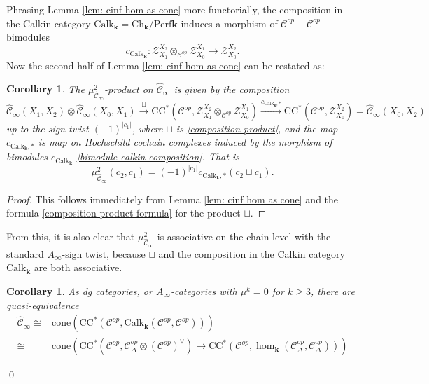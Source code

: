 \documentclass[11pt]{amsproc}
\def\K{{\mathbf{k}}}
\def\cZ{\mathcal{Z}}
\def\cc{\mathcal{C}}
\def\r#1{\mathrm{#1}}
\def\D{\Delta}
\def\ainf{A_\infty}
\def\ch{\mathrm{Ch}}
\def\perf{\mathrm{Perf}}
\def\calk{\mathrm{Calk}}
\def\cone{\mathrm{cone}}
\def\cinf{\widehat{\cc}_{\infty}}
\newtheorem{cor}[lem]{Corollary}
\theoremstyle{remark}
\numberwithin{equation}{section}
\begin{document}
Phrasing Lemma \ref{lem: cinf hom as cone} more functorially, 
the composition in the Calkin category $\calk_{\K} = \ch_{\K}/\perf \K$ induces a morphism of $\cc^{op}-\cc^{op}$-bimodules 
\begin{equation}\label{bimodule calkin composition}
c_{\calk_{\K}}: \cZ_{X_{1}}^{X_{2}} \otimes_{\cc^{op}} \cZ_{X_{0}}^{X_{1}} \to \cZ_{X_{0}}^{X_{2}}.
\end{equation}
Now the second half of Lemma \ref{lem: cinf hom as cone} can be restated as:

\begin{cor}\label{cor: mu2 on cinf is composition}
The $\mu^{2}_{\cinf}$-product on $\cinf$ is given by the composition
\begin{equation}\label{mu2 on cinf is composition}
\cinf(X_{1}, X_{2}) \otimes \cinf(X_{0}, X_{1}) \stackrel{\sqcup}\to \r{CC}^{*}(\cc^{op}, \cZ_{X_{1}}^{X_{2}} \otimes_{\cc^{op}} \cZ_{X_{0}}^{X_{1}}) \stackrel{c_{\calk_{\K}, *}}\to \r{CC}^{*}(\cc^{op}, \cZ_{X_{0}}^{X_{2}}) = \cinf(X_{0}, X_{2})
\end{equation}
up to the sign twist $(-1)^{|c_{1}|}$,
where $\sqcup$ is \eqref{composition product}, 
and the map $c_{\calk_{\K}, *}$ is map on Hochschild cochain complexes induced by the morphism of bimodules $c_{\calk_{\K}}$ \eqref{bimodule calkin composition}.
That is
\begin{equation}\label{mu2 on cinf composition sign}
\mu^{2}_{\cinf}(c_{2}, c_{1}) = (-1)^{|c_{1}|} c_{\calk_{\K}, *}(c_{2} \sqcup c_{1}).
\end{equation}
\end{cor}
\begin{proof}
This follows immediately from Lemma \ref{lem: cinf hom as cone} and the formula \eqref{composition product formula} for the product $\sqcup$.
\end{proof}

From this, it is also clear that $\mu^{2}_{\cinf}$ is associative on the chain level with the standard $\ainf$-sign twist,
because $\sqcup$ and the composition in the Calkin category $\calk_{\K}$ are both associative.

\begin{cor}\label{cor: cinf as cone}
As dg categories, or $\ainf$-categories with $\mu^{k} = 0$ for $k \ge 3$, there are quasi-equivalence
\begin{align}\label{cinf as cone}
\cinf \cong & \cone(\r{CC}^{*}(\cc^{op}, \calk_{\K}(\cc^{op}, \cc^{op}))) \\
\cong & \cone(\r{CC}^{*}(\cc^{op}, \cc^{op}_{\D} \otimes (\cc^{op})^{\vee}) \to \r{CC}^{*}(\cc^{op}, \hom_{\K}(\cc^{op}_{\D}, \cc^{op}_{\D})))
\end{align}
\end{cor} \qed
\end{document}
